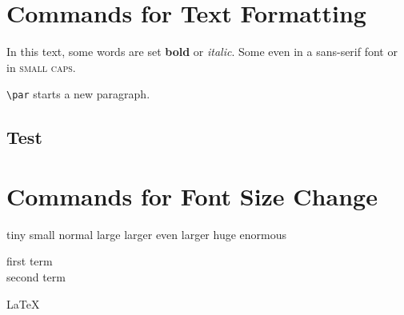 \documentclass{scrartcl}
\begin{document}
	\tableofcontents

	\section{Commands for Text Formatting}
	In this text, some words are set \textsf{\textbf{bold}} or \textit{italic}. Some even in a \textsf{sans-serif font} or in \textsc{small caps}. \par \texttt{\textbackslash par} starts a new paragraph.

	\subsection{Test}


	\section{Commands for Font Size Change}

	\tiny tiny \small small \normalsize normal \large large \Large larger \LARGE even larger \huge huge \Huge  enormous
	\normalsize

	\begin{description}
		\item[first term] \blindtext
		\item[second term] \blindtext
	\end{description}

	\LaTeX
\end{document}
